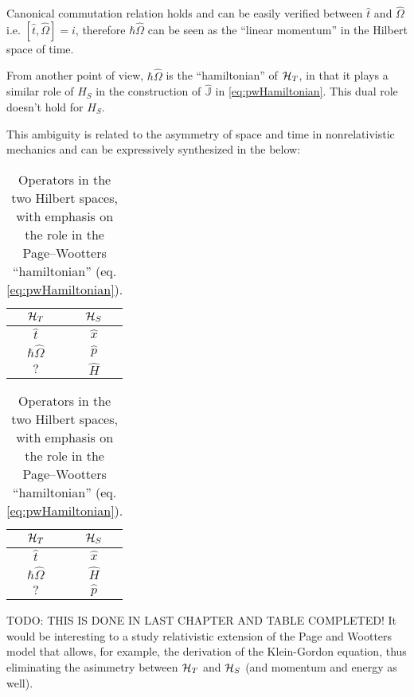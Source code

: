 Canonical commutation relation holds and can be easily verified
between $\hat{t}$ and $\hat{\Omega}$
i.e. $[\hat{t}, \hat{\Omega}] = i$,
therefore $\hbar\hat{\Omega}$ can be seen as the ``linear momentum''
in the Hilbert space of time.

From another point of view, $\hbar\hat{\Omega}$ is the ``hamiltonian'' of $\mathcal{H}_T$,
in that it plays a similar role of $H_S$ in the construction of
$\hat{\mathbb{J}}$ in \eqref{eq:pwHamiltonian}. This dual role doesn't hold
for $H_S$. 

This ambiguity is related to the a\-sym\-me\-try of space and time in
non\-re\-la\-ti\-vi\-stic
mechanics and can be expressively synthesized in the below:
{
  \begin{table}[h!]
    \parbox{.45\linewidth}{
      \centering
      \begin{tabular}{c|c}
        $\mathcal{H}_T$        & $\mathcal{H}_S$  \\
        \hline
        \hline
        $\hat{t}$           & $\hat{x}$     \\
        \hline
        $\hbar\hat{\Omega}$ & $\hat{p}$     \\
        \hline
        $?$                 & $\hat{H}$
      \end{tabular}
      {\caption{
        Operators in the two Hilbert spaces,
        with emphasis on the algebraic relation
        to other operators in the same space.
      }\label{op_comparison_alg}}
    }
    \hfill
    \parbox{.45\linewidth}{
      \centering
      \begin{tabular}{c|c}
        $\mathcal{H}_T$        & $\mathcal{H}_S$  \\
        \hline
        \hline
        $\hat{t}$           & $\hat{x}$     \\
        \hline
        $\hbar\hat{\Omega}$ & $\hat{H}$     \\
        \hline
        $?$                 & $\hat{p}$
      \end{tabular}
      {\caption{
        Operators in the two Hilbert spaces,
        with emphasis on the role in the
        Page--Wootters ``hamiltonian'' (eq. \ref{eq:pwHamiltonian}).
      }\label{op_comparison_J}}
    }
  \end{table}
}

TODO: THIS IS DONE IN LAST CHAPTER AND TABLE COMPLETED!
It would be interesting to a study relativistic extension of the
Page and Wootters model that allows, for example, the derivation of the Klein-Gordon
equation, thus eliminating the asimmetry between
$\mathcal{H}_T$ and $\mathcal{H}_S$ (and momentum and energy as well).

